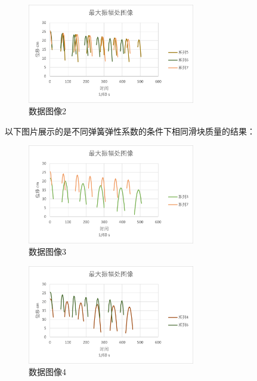 \documentclass{ctexart}
\begin{document}
  \begin{figure}[H]
    \centering
    \includegraphics[width=0.65\textwidth,height=0.35\textheight]{zhiliang2.png}
    \caption{数据图像2}
  \end{figure}
  \newpage
  以下图片展示的是不同弹簧弹性系数的条件下相同滑块质量的结果：
  \begin{figure}[H]
    \centering
    \includegraphics[width=0.65\textwidth,height=0.4\textheight]{tanhuang1.png}
    \caption{数据图像3}
  \end{figure}

  \begin{figure}[H]
    \centering
    \includegraphics[width=0.65\textwidth,height=0.4\textheight]{tanhuang2.png}
    \caption{数据图像4}
  \end{figure}
  \newpage
\end{document}
